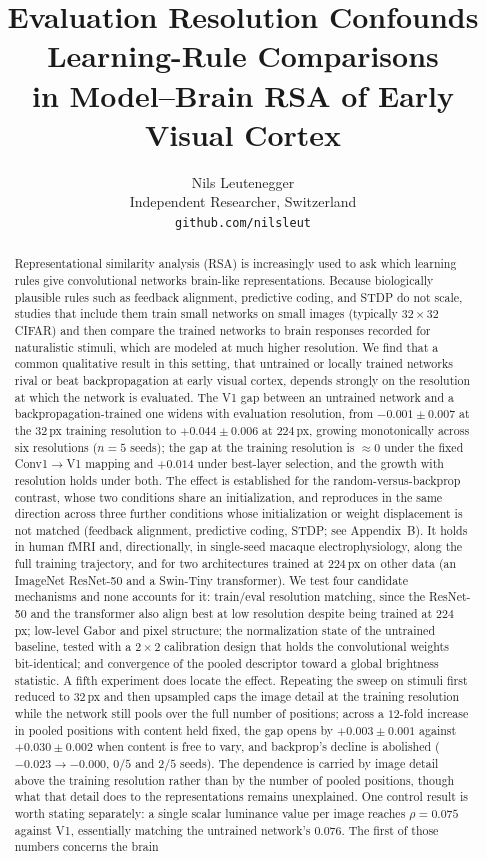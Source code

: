 \documentclass[10pt,twocolumn]{article}
\title{Evaluation Resolution Confounds Learning-Rule Comparisons\\
in Model--Brain RSA of Early Visual Cortex}
\author{Nils Leutenegger\\
Independent Researcher, Switzerland\\
\texttt{github.com/nilsleut}}
\date{}
\begin{document}
\maketitle

\begin{abstract}
Representational similarity analysis (RSA) is increasingly used to ask which learning rules give convolutional networks brain-like representations. Because biologically plausible rules such as feedback alignment, predictive coding, and STDP do not scale, studies that include them train small networks on small images (typically $32\times32$ CIFAR) and then compare the trained networks to brain responses recorded for naturalistic stimuli, which are modeled at much higher resolution. We find that a common qualitative result in this setting, that untrained or locally trained networks rival or beat backpropagation at early visual cortex, depends strongly on the resolution at which the network is evaluated. The V1 gap between an untrained network and a backpropagation-trained one widens with evaluation resolution, from $-0.001 \pm 0.007$ at the $32$\,px training resolution to $+0.044 \pm 0.006$ at $224$\,px, growing monotonically across six resolutions ($n=5$ seeds); the gap at the training resolution is $\approx 0$ under the fixed Conv1$\to$V1 mapping and $+0.014$ under best-layer selection, and the growth with resolution holds under both. The effect is established for the random-versus-backprop contrast, whose two conditions share an initialization, and reproduces in the same direction across three further conditions whose initialization or weight displacement is not matched (feedback alignment, predictive coding, STDP; see Appendix~B). It holds in human fMRI and, directionally, in single-seed macaque electrophysiology, along the full training trajectory, and for two architectures trained at $224$\,px on other data (an ImageNet ResNet-50 and a Swin-Tiny transformer). We test four candidate mechanisms and none accounts for it: train/eval resolution matching, since the ResNet-50 and the transformer also align best at low resolution despite being trained at $224$\,px; low-level Gabor and pixel structure; the normalization state of the untrained baseline, tested with a $2\times2$ calibration design that holds the convolutional weights bit-identical; and convergence of the pooled descriptor toward a global brightness statistic. A fifth experiment does locate the effect. Repeating the sweep on stimuli first reduced to $32$\,px and then upsampled caps the image detail at the training resolution while the network still pools over the full number of positions; across a $12$-fold increase in pooled positions with content held fixed, the gap opens by $+0.003 \pm 0.001$ against $+0.030 \pm 0.002$ when content is free to vary, and backprop's decline is abolished ($-0.023 \to -0.000$, $0/5$ and $2/5$ seeds). The dependence is carried by image detail above the training resolution rather than by the number of pooled positions, though what that detail does to the representations remains unexplained. One control result is worth stating separately: a single scalar luminance value per image reaches $\rho = 0.075$ against V1, essentially matching the untrained network's $0.076$. The first of those numbers concerns the brain 
\end{abstract}
\end{document}
